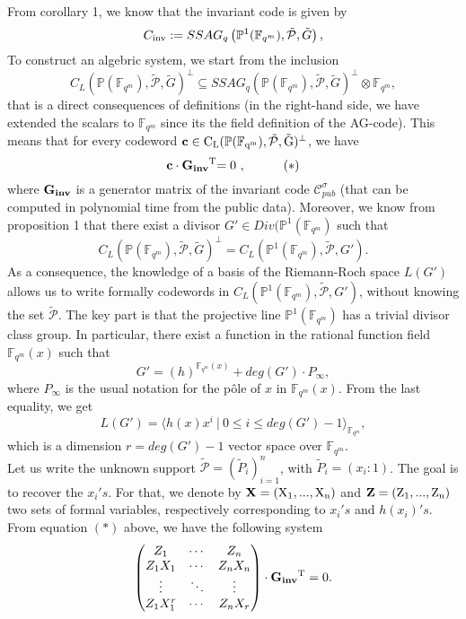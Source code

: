 \documentclass[10pt]{article}
\newcommand{\cd}{\cdot}
\newcommand{\fqm}{\mathbb{F}_{q^m}}
\newcommand{\su}{\subseteq}
\newcommand{\PR}{\mathcal{P}}
\begin{document}
From corollary 1, we know that the invariant code is given by 
\[C_{\rm{inv}} := SSAG_q\left(\mathbb{P}^1(\fqm),\tilde{\PR},\tilde{G}\right),\]
To construct an algebric system, we start from the inclusion 
\[C_L(\mathbb{P}(\fqm),\tilde{\PR},\tilde{G})^{\perp} \su SSAG_q(\mathbb{P}(\fqm),\tilde{\PR},\tilde{G})^{\perp} \otimes \fqm,\]
that is a direct consequences of definitions (in the right-hand side, we have extended the scalars to $\fqm$ since its the field definition of the AG-code). This means that for every codeword $\bf{c} \rm \in C_L(\mathbb{P}(\fqm),\tilde{\PR},\tilde{G})^{\perp}$, we have 
\[\bf{c \cd G_{inv}}^{\rm{T}}  \rm {= 0}\ , \quad \quad \quad (*)\]
where $\bf{G_{inv}}$ is a generator matrix of the invariant code $\mathcal{C}_{pub}^{\sigma}$ (that can be computed in polynomial time from the public data). Moreover, we know from proposition 1 that there exist a divisor $G' \in Div(\mathbb{P}^1(\fqm)$ such that
\[ C_L(\mathbb{P}(\fqm),\tilde{\PR},\tilde{G})^{\perp} = C_L(\mathbb{P}^1(\fqm),\tilde{\PR},G').\]
As a consequence, the knowledge of a basis of the Riemann-Roch space $L(G')$ allows us to write formally codewords in $C_L(\mathbb{P}^1(\fqm),\tilde{\PR},G')$, without knowing the set $\tilde{\PR}$. The key part is that the projective line $\mathbb{P}^1(\fqm)$ has a trivial divisor class group. In particular, there exist a function in the rational function field $\fqm(x)$ such that
\[ G' = (h)^{\fqm(x)} + deg(G') \cd P_{\infty},\]
where $P_{\infty}$ is the usual notation for the pôle of $x$ in $\fqm(x)$. From the last equality, we get
\[L(G') = \langle h(x)x^i \ | \ 0 \leq i \leq deg(G')-1\rangle_{\fqm},\]
which is a dimension $r=deg(G')-1$ vector space over $\fqm$. \\
Let us write the unknown support $\tilde{\PR} = (\tilde{P}_i)_{i=1}^n$, with $\tilde{P}_i=(x_i:1)$. The goal is to recover the $x_i's$. For that, we denote by  
$\bf{X} \rm = (X_1,...,X_n)$ and $\bf{Z} \rm = (Z_1,...,Z_n)$ two sets of formal variables, respectively corresponding to $x_i's$ and $h(x_i)'s$. From equation $(*)$ above, we have the following system
\begin{equation*}
\begin{pmatrix}
Z_1 & \cdots & Z_n \\
Z_1X_1 & \cdots & Z_nX_n \\
\vdots & \ddots & \vdots \\
Z_1X_1^r & \cdots & Z_nX_r 
\end{pmatrix}
\cd \bf{G_{inv}} \rm{^T} = 0.
\end{equation*}
\end{document}
